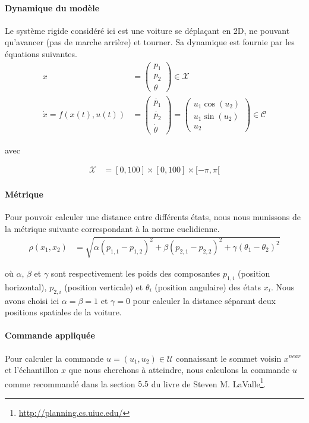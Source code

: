 \documentclass[12pt]{article}
\begin{document}
\paragraph{Dynamique du modèle} Le système rigide considéré ici est une voiture se déplaçant en 2D, ne pouvant qu'avancer (pas de marche arrière) et tourner. Sa dynamique est fournie par les équations suivantes.
\begin{align*}
x &= \begin{pmatrix}
p_1\\ p_2\\ \theta
\end{pmatrix} \in \mathcal{X}\\
\dot{x} = f(x(t),u(t)) &= \begin{pmatrix}
\dot{p_1}\\ \dot{p_2}\\ \dot{\theta}
\end{pmatrix} = \begin{pmatrix}
u_1 \cos(u_2)\\ u_1 \sin(u_2)\\ u_2
\end{pmatrix} \in \mathcal{C}
\end{align*}

avec

\begin{align*}
\mathcal{X}&=[0,100]\times[0,100]\times[-\pi,\pi[
\end{align*}

\paragraph{Métrique} Pour pouvoir calculer une distance entre différents états, nous nous munissons de la métrique suivante correspondant à la norme euclidienne.
\begin{align*}
\rho(x_1,x_2) &= \sqrt{\alpha(p_{1,1}-p_{1,2})^2+\beta(p_{2,1}-p_{2,2})^2+\gamma(\theta_1-\theta_2)^2}
\end{align*}

où $\alpha$, $\beta$ et $\gamma$ sont respectivement les poids des composantes $p_{1,i}$ (position horizontal), $p_{2,i}$ (position verticale) et $\theta_i$ (position angulaire) des états $x_i$. Nous avons choisi ici $\alpha = \beta = 1$ et $\gamma = 0$ pour calculer la distance séparant deux positions spatiales de la voiture.

\paragraph{Commande appliquée} Pour calculer la commande $u=(u_1,u_2) \in \mathcal{U}$ connaissant le sommet voisin $x^{near}$ et l'échantillon $x$ que nous cherchons à atteindre, nous calculons la commande $u$ comme recommandé dans la section $5.5$ du livre de Steven M. LaValle\footnote{\url{http://planning.cs.uiuc.edu/}}.
\end{document}
